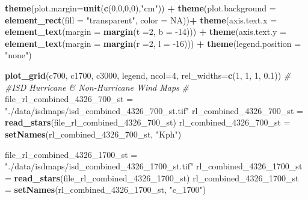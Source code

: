 \documentclass[12pt,twoside]{reedthesis}
\newenvironment{Shaded}{\begin{snugshade}}{\end{snugshade}}
\newcommand{\CommentTok}[1]{\textcolor[rgb]{0.56,0.35,0.01}{\textit{#1}}}
\newcommand{\DataTypeTok}[1]{\textcolor[rgb]{0.13,0.29,0.53}{#1}}
\newcommand{\DecValTok}[1]{\textcolor[rgb]{0.00,0.00,0.81}{#1}}
\newcommand{\FloatTok}[1]{\textcolor[rgb]{0.00,0.00,0.81}{#1}}
\newcommand{\KeywordTok}[1]{\textcolor[rgb]{0.13,0.29,0.53}{\textbf{#1}}}
\newcommand{\NormalTok}[1]{#1}
\newcommand{\OperatorTok}[1]{\textcolor[rgb]{0.81,0.36,0.00}{\textbf{#1}}}
\newcommand{\OtherTok}[1]{\textcolor[rgb]{0.56,0.35,0.01}{#1}}
\newcommand{\StringTok}[1]{\textcolor[rgb]{0.31,0.60,0.02}{#1}}
\begin{document}
\begin{Shaded}
\begin{Highlighting}[]
\StringTok{  }\KeywordTok{theme}\NormalTok{(}\DataTypeTok{plot.margin=}\KeywordTok{unit}\NormalTok{(}\KeywordTok{c}\NormalTok{(}\DecValTok{0}\NormalTok{,}\DecValTok{0}\NormalTok{,}\DecValTok{0}\NormalTok{,}\DecValTok{0}\NormalTok{),}\StringTok{"cm"}\NormalTok{)) }\OperatorTok{+}
\StringTok{  }\KeywordTok{theme}\NormalTok{(}\DataTypeTok{plot.background =} \KeywordTok{element_rect}\NormalTok{(}\DataTypeTok{fill =} \StringTok{"transparent"}\NormalTok{, }\DataTypeTok{color =} \OtherTok{NA}\NormalTok{))}\OperatorTok{+}
\StringTok{  }\KeywordTok{theme}\NormalTok{(}\DataTypeTok{axis.text.x =} \KeywordTok{element_text}\NormalTok{(}\DataTypeTok{margin =}  \KeywordTok{margin}\NormalTok{(}\DataTypeTok{t =}\DecValTok{2}\NormalTok{, }\DataTypeTok{b =} \DecValTok{-14}\NormalTok{))) }\OperatorTok{+}\StringTok{ }
\StringTok{  }\KeywordTok{theme}\NormalTok{(}\DataTypeTok{axis.text.y =} \KeywordTok{element_text}\NormalTok{(}\DataTypeTok{margin =}  \KeywordTok{margin}\NormalTok{(}\DataTypeTok{r =}\DecValTok{2}\NormalTok{, }\DataTypeTok{l =} \DecValTok{-16}\NormalTok{))) }\OperatorTok{+}
\StringTok{  }\KeywordTok{theme}\NormalTok{(}\DataTypeTok{legend.position =} \StringTok{"none"}\NormalTok{)}

\KeywordTok{plot_grid}\NormalTok{(c700, c1700, c3000, legend, }\DataTypeTok{ncol=}\DecValTok{4}\NormalTok{, }\DataTypeTok{rel_widths=}\KeywordTok{c}\NormalTok{(}\DecValTok{1}\NormalTok{, }\DecValTok{1}\NormalTok{, }\DecValTok{1}\NormalTok{, }\FloatTok{0.1}\NormalTok{))}
\CommentTok{#}
\CommentTok{#ISD Hurricane & Non-Hurricane Wind Maps}
\CommentTok{#}
\NormalTok{file_rl_combined_}\DecValTok{4326}\NormalTok{_}\DecValTok{700}\NormalTok{_st =}\StringTok{ "./data/isdmaps/isd_combined_4326_700_st.tif"}
\NormalTok{rl_combined_}\DecValTok{4326}\NormalTok{_}\DecValTok{700}\NormalTok{_st =}\StringTok{ }\KeywordTok{read_stars}\NormalTok{(file_rl_combined_}\DecValTok{4326}\NormalTok{_}\DecValTok{700}\NormalTok{_st)}
\NormalTok{rl_combined_}\DecValTok{4326}\NormalTok{_}\DecValTok{700}\NormalTok{_st =}\StringTok{ }\KeywordTok{setNames}\NormalTok{(rl_combined_}\DecValTok{4326}\NormalTok{_}\DecValTok{700}\NormalTok{_st, }\StringTok{"Kph"}\NormalTok{)}

\NormalTok{file_rl_combined_}\DecValTok{4326}\NormalTok{_}\DecValTok{1700}\NormalTok{_st =}\StringTok{ "./data/isdmaps/isd_combined_4326_1700_st.tif"}
\NormalTok{rl_combined_}\DecValTok{4326}\NormalTok{_}\DecValTok{1700}\NormalTok{_st =}\StringTok{ }\KeywordTok{read_stars}\NormalTok{(file_rl_combined_}\DecValTok{4326}\NormalTok{_}\DecValTok{1700}\NormalTok{_st)}
\NormalTok{rl_combined_}\DecValTok{4326}\NormalTok{_}\DecValTok{1700}\NormalTok{_st =}\StringTok{ }\KeywordTok{setNames}\NormalTok{(rl_combined_}\DecValTok{4326}\NormalTok{_}\DecValTok{1700}\NormalTok{_st, }\StringTok{"c_1700"}\NormalTok{)}


\end{Highlighting}
\end{Shaded}
\end{document}
